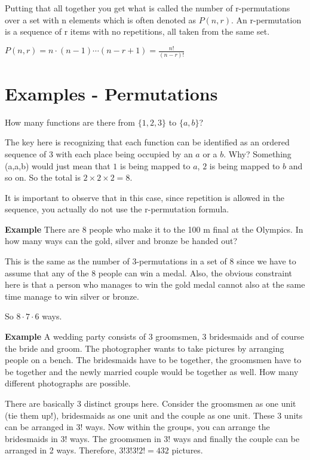 \documentclass[12pt]{article}
\begin{document}
Putting that all together you get what is called the number of r-permutations over a set with n elements which is often denoted as $P(n,r)$. An r-permutation is a sequence of r items with no repetitions, all taken from the same set.

$P(n,r) = n \cdot (n-1) \cdots (n-r+1) = \frac{n!}{(n-r)!}$

\section*{Examples -  Permutations}

How many functions are there from $\{1,2,3\}$ to $\{a,b\}$?

The key here is recognizing that each function can be identified as an ordered sequence of 3 with each place being occupied by an $a$ or a $b$. Why? Something (a,a,b) would just mean that $1$ is being mapped to $a$, $2$ is being mapped to $b$ and so on. 
So the total is $2 \times 2 \times 2 = 8$. 

It is important to observe that in this case, since repetition is allowed in the sequence, you actually do not use the r-permutation formula. 

\medskip

\textbf{Example} There are 8 people who make it to the 100 m final at the Olympics. In how many ways can the gold, silver and bronze be handed out?

This is the same as the number of 3-permutations in a set of 8 since we have to assume that any of the 8 people can win a medal. Also, the obvious constraint here is that a person who manages to win the gold medal cannot also at the same time manage to win silver or bronze. 

So $8 \cdot 7 \cdot 6$  ways.

\medskip

\textbf{Example} A wedding party consists of 3 groomsmen, 3 bridesmaids and of course the bride and groom. The photographer wants to take pictures by arranging people on a bench. The bridesmaids have to be together, the groomsmen have to be together and the newly married couple would be together as well. How many different photographs are possible.

There are basically 3 distinct groups here. Consider the groomsmen as one unit (tie them up!), bridesmaids as one unit and the couple as one unit. These 3 units can be arranged in 3! ways. Now within the groups, you can arrange the bridesmaids in 3! ways. The groomsmen in 3! ways and finally the couple can be arranged in 2 ways.
Therefore, $3!3!3!2! = 432$ pictures. 
\end{document}
